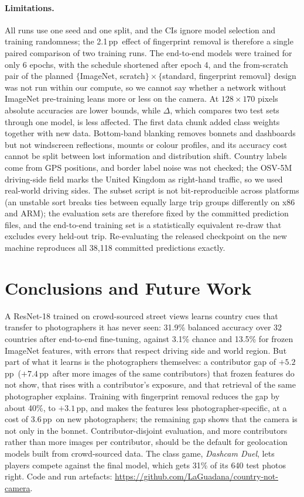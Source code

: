 \documentclass[clean,twocolumn]{bam-project}
\newcommand{\pp}{\,pp}
\begin{document}
\paragraph{Limitations.} All runs use one seed and one split, and the CIs ignore model selection and
training randomness; the 2.1\pp\ effect of fingerprint removal is therefore a single paired comparison of
two training runs. The end-to-end models were trained for only 6 epochs, with the schedule shortened after
epoch 4, and the from-scratch pair of the planned
$\{$ImageNet, scratch$\}\times\{$standard, fingerprint removal$\}$ design was not run within our compute,
so we cannot say whether a network without ImageNet pre-training leans more or less on the camera. At
$128\times170$ pixels absolute accuracies are lower bounds, while $\Delta$, which compares two test sets
through one model, is less affected. The first data chunk added class weights together with new data.
Bottom-band blanking removes bonnets and dashboards but not windscreen reflections, mounts or colour
profiles, and its accuracy cost cannot be split between lost information and distribution shift. Country
labels come from GPS positions, and border label noise was not checked; the OSV-5M driving-side field marks
the United Kingdom as right-hand traffic, so we used real-world driving sides. The subset script is not
bit-reproducible across platforms (an unstable sort breaks ties between equally large trip groups
differently on x86 and ARM); the evaluation sets are therefore fixed by the committed prediction files,
and the end-to-end training set is a statistically equivalent re-draw that excludes every held-out trip.
Re-evaluating the released checkpoint on the new machine reproduces all 38{,}118 committed predictions
exactly.

\section{Conclusions and Future Work}
A ResNet-18 trained on crowd-sourced street views learns country cues that transfer to photographers it
has never seen: 31.9\% balanced accuracy over 32 countries after end-to-end fine-tuning, against 3.1\%
chance and 13.5\% for frozen ImageNet features, with errors that respect driving side and world region.
But part of what it learns is the photographers themselves: a contributor gap of $+5.2$\pp\ ($+7.4$\pp\
after more images of the same contributors) that frozen features do not show, that rises with a
contributor's exposure, and that retrieval of the same photographer explains. Training with fingerprint
removal reduces the gap by about 40\%, to $+3.1$\pp, and makes the features less photographer-specific, at
a cost of 3.6\pp\ on new photographers; the remaining gap shows that the camera is not only in the bonnet.
Contributor-disjoint evaluation, and more contributors rather than more images per contributor, should be
the default for geolocation models built from crowd-sourced data. The class game, \emph{Dashcam Duel}, lets
players compete against the final model, which gets 31\% of its 640 test photos right. Code and run
artefacts: \url{https://github.com/LaGuadana/country-not-camera}.
\end{document}
